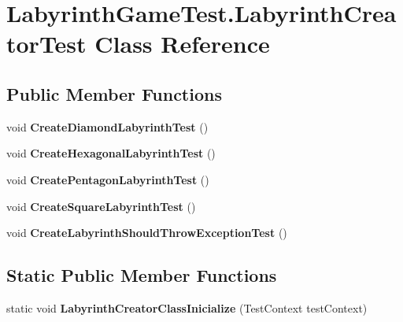 \hypertarget{class_labyrinth_game_test_1_1_labyrinth_creator_test}{\section{Labyrinth\+Game\+Test.\+Labyrinth\+Creator\+Test Class Reference}
\label{class_labyrinth_game_test_1_1_labyrinth_creator_test}
}
\subsection*{Public Member Functions}
\begin{DoxyCompactItemize}
\item 
\hypertarget{class_labyrinth_game_test_1_1_labyrinth_creator_test_a7b44a671f9addcd572093aa08bce0ed3}{void {\bfseries Create\+Diamond\+Labyrinth\+Test} ()}\label{class_labyrinth_game_test_1_1_labyrinth_creator_test_a7b44a671f9addcd572093aa08bce0ed3}

\item 
\hypertarget{class_labyrinth_game_test_1_1_labyrinth_creator_test_adb441732990a7c5c95704cd8917ad02e}{void {\bfseries Create\+Hexagonal\+Labyrinth\+Test} ()}\label{class_labyrinth_game_test_1_1_labyrinth_creator_test_adb441732990a7c5c95704cd8917ad02e}

\item 
\hypertarget{class_labyrinth_game_test_1_1_labyrinth_creator_test_adc983be692b3d791c0a7756ceb0fbda4}{void {\bfseries Create\+Pentagon\+Labyrinth\+Test} ()}\label{class_labyrinth_game_test_1_1_labyrinth_creator_test_adc983be692b3d791c0a7756ceb0fbda4}

\item 
\hypertarget{class_labyrinth_game_test_1_1_labyrinth_creator_test_a473a6bb85904c52a08beb61d671e5dc5}{void {\bfseries Create\+Square\+Labyrinth\+Test} ()}\label{class_labyrinth_game_test_1_1_labyrinth_creator_test_a473a6bb85904c52a08beb61d671e5dc5}

\item 
\hypertarget{class_labyrinth_game_test_1_1_labyrinth_creator_test_a74cd5fd550ad201e5b60e3dbf1b5b439}{void {\bfseries Create\+Labyrinth\+Should\+Throw\+Exception\+Test} ()}\label{class_labyrinth_game_test_1_1_labyrinth_creator_test_a74cd5fd550ad201e5b60e3dbf1b5b439}

\end{DoxyCompactItemize}
\subsection*{Static Public Member Functions}
\begin{DoxyCompactItemize}
\item 
\hypertarget{class_labyrinth_game_test_1_1_labyrinth_creator_test_a8dd89a98a55dbf31c81d4be6b97af077}{static void {\bfseries Labyrinth\+Creator\+Class\+Inicialize} (Test\+Context test\+Context)}\label{class_labyrinth_game_test_1_1_labyrinth_creator_test_a8dd89a98a55dbf31c81d4be6b97af077}

\end{DoxyCompactItemize}


